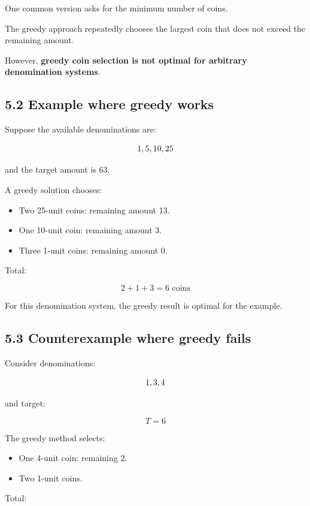 One common version asks for the minimum number of coins.

The greedy approach repeatedly chooses the largest coin that does not exceed the remaining amount.

However, \textbf{greedy coin selection is not optimal for arbitrary denomination systems}.

\subsection{5.2 Example where greedy works}

Suppose the available denominations are:


\[
\\{1,5,10,25\\}
\]


and the target amount is 63.

A greedy solution chooses:

\begin{itemize}
    \item Two 25-unit coins: remaining amount 13.
    \item One 10-unit coin: remaining amount 3.
    \item Three 1-unit coins: remaining amount 0.
\end{itemize}

Total:


\[
2+1+3=\boxed{6\text{ coins}}
\]


For this denomination system, the greedy result is optimal for the example.

\subsection{5.3 Counterexample where greedy fails}

Consider denominations:


\[
\\{1,3,4\\}
\]


and target:


\[
T=6
\]


The greedy method selects:

\begin{itemize}
    \item One 4-unit coin: remaining 2.
    \item Two 1-unit coins.
\end{itemize}

Total:


